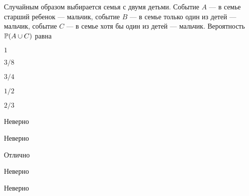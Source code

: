 
\begin{question}
Случайным образом выбирается семья с двумя детьми. Событие \(A\) --- в
семье старший ребенок --- мальчик, событие \(B\) --- в семье только один
из детей --- мальчик, событие \(C\) --- в семье хотя бы один из детей
--- мальчик. Вероятность \(\P(A \cup C)\) равна
\begin{answerlist}
  \item \(1\)
  \item \(3/8\)
  \item \(3/4\)
  \item \(1/2\)
  \item \(2/3\)
\end{answerlist}
\end{question}

\begin{solution}
\begin{answerlist}
  \item Неверно
  \item Неверно
  \item Отлично
  \item Неверно
  \item Неверно
\end{answerlist}
\end{solution}

